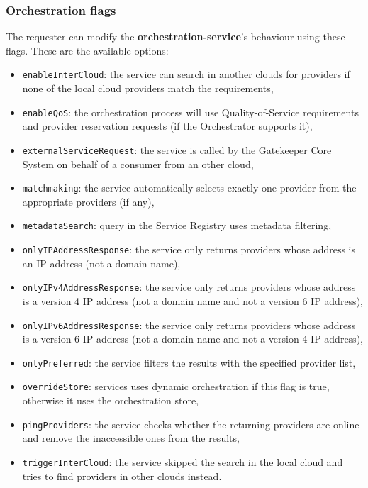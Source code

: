\documentclass[a4paper]{arrowhead}
\begin{document}
\subsubsection{Orchestration flags}

The requester can modify the \textbf{orchestration-service}'s behaviour using these flags. These are the available options:

\begin{itemize}
    \item \texttt{enableInterCloud}: the service can search in another clouds for providers if none of the local cloud providers match the requirements,
    \item \texttt{enableQoS}: the orchestration process will use Quality-of-Service requirements and provider reservation requests (if the Orchestrator supports it),
    \item \texttt{externalServiceRequest}: the service is called by the Gatekeeper Core System on behalf of a consumer from an other cloud,
    \item \texttt{matchmaking}: the service automatically selects exactly one provider from the appropriate providers (if any),
    \item \texttt{metadataSearch}: query in the Service Registry uses metadata filtering,
    \item \texttt{onlyIPAddressResponse}: the service only returns providers whose address is an IP address (not a domain name),
    \item \texttt{onlyIPv4AddressResponse}: the service only returns providers whose address is a version 4 IP address (not a domain name and not a version 6 IP address),
    \item \texttt{onlyIPv6AddressResponse}: the service only returns providers whose address is a version 6 IP address (not a domain name and not a version 4 IP address),
    \item \texttt{onlyPreferred}: the service filters the results with the specified provider list,
    \item \texttt{overrideStore}: services uses dynamic orchestration if this flag is true, otherwise it uses the orchestration store,
    \item \texttt{pingProviders}: the service checks whether the returning providers are online and remove the in\-accessible ones from the results,
    \item \texttt{triggerInterCloud}: the service skipped the search in the local cloud and tries to find providers in other clouds instead.
\end{itemize}
\end{document}
